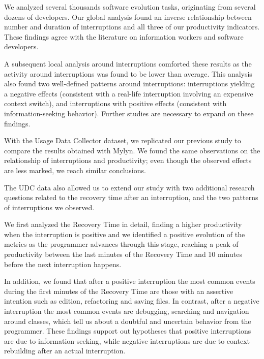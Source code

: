 \documentclass[times]{smrauth}
\begin{document}
We analyzed several thousands software evolution tasks, originating from several dozens of developers. Our global analysis found an inverse relationship between number and duration of interruptions and all three of our productivity indicators. These findings agree with the literature on information workers and software developers. 

A subsequent local analysis around interruptions comforted these results as the activity around interruptions was found to be lower than average. This analysis also found two well-defined patterns around interruptions: interruptions yielding a negative effects (consistent with a real-life interruption involving an expensive context switch), and interruptions with positive effects (consistent with information-seeking behavior). Further studies are necessary to expand on these findings.

With the Usage Data Collector dataset, we replicated our previous study to compare the results obtained with Mylyn. We found the same observations on the relationship of interruptions and productivity; even though the observed effects are less marked, we reach similar conclusions.

The UDC data also allowed us to extend our study with two additional research questions related to the recovery time after an interruption, and the two patterns of interruptions we observed. 

We first analyzed the Recovery Time in detail, finding a higher productivity when the interruption is positive and we identified a positive evolution of the metrics as the programmer advances through this stage, reaching a peak of productivity between the last minutes of the Recovery Time and 10 minutes before the next interruption happens.  

In addition, we found that after a positive interruption the most common events during the first minutes of the Recovery Time are those with an assertive intention such as edition, refactoring and saving files. In contrast, after a negative interruption the most common events are debugging, searching and navigation around classes, which tell us about a doubtful and uncertain behavior from the programmer. These findings support out hypotheses that positive interruptions are due to information-seeking, while negative interruptions are due to context rebuilding after an actual interruption.





\end{document}
